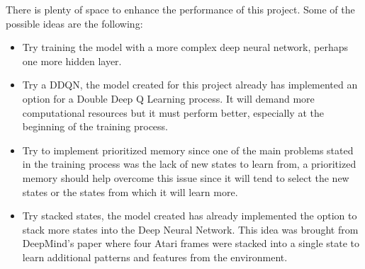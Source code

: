 There is plenty of space to enhance the performance of this project. Some of the possible ideas are the following:
\begin{itemize}
\item Try training the model with a more complex deep neural network, perhaps one more hidden layer.
\item Try a DDQN, the model created for this project already has implemented an option for a Double Deep Q Learning process. It will demand more computational resources but it must perform better, especially at the beginning of the training process.
\item Try to implement prioritized memory since one of the main problems stated in the training process was the lack of new states to learn from, a prioritized memory should help overcome this issue since it will tend to select the new states or the states from which it will learn more.
\item Try stacked states, the model created has already implemented the option to stack more states into the Deep Neural Network. This idea was brought from DeepMind's paper where four Atari frames were stacked into a single state to learn additional patterns and features from the environment. \cite{mnih2015humanlevel}
\end{itemize}